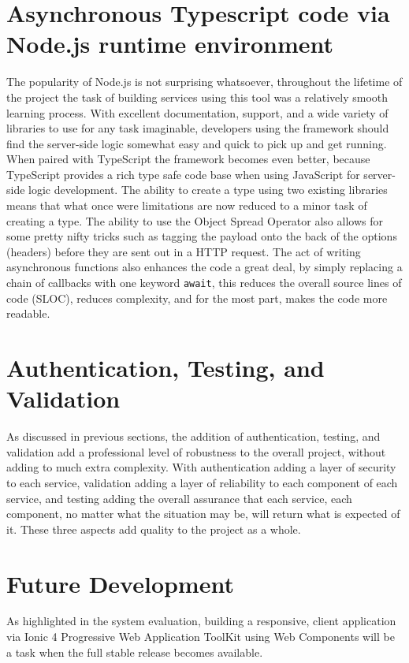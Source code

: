 \section{Asynchronous Typescript code via Node.js runtime environment}
The popularity of Node.js is not surprising whatsoever, throughout the lifetime of the project the task of building services using this tool was a relatively smooth learning process. With excellent documentation, support, and a wide variety of libraries to use for any task imaginable, developers using the framework should find the server-side logic somewhat easy and quick to pick up and get running. When paired with TypeScript the framework becomes even better, because TypeScript provides a rich type safe code base when using JavaScript for server-side logic development. The ability to create a type using two existing libraries means that what once were limitations are now reduced to a minor task of creating a type. The ability to use the Object Spread Operator also allows for some pretty nifty tricks such as tagging the payload onto the back of the options (headers) before they are sent out in a HTTP request. The act of writing asynchronous functions also enhances the code a great deal, by simply replacing a chain of callbacks with one keyword \texttt{await}, this reduces the overall source lines of code (SLOC), reduces complexity, and for the most part, makes the code more readable.

\section{Authentication, Testing, and Validation}
As discussed in previous sections, the addition of authentication, testing, and validation add a professional level of robustness to the overall project, without adding to much extra complexity. With authentication adding a layer of security to each service, validation adding a layer of reliability to each component of each service, and testing adding the overall assurance that each service, each component, no matter what the situation may be, will return what is expected of it. These three aspects add quality to the project as a whole.

\section{Future Development}
As highlighted in the system evaluation, building a responsive, client application via Ionic 4 Progressive Web Application ToolKit using Web Components will be a task when the full stable release becomes available. 



